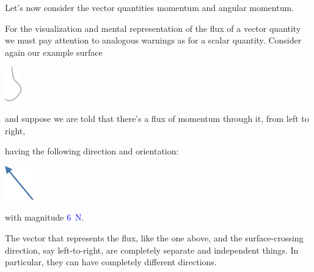 

\label{nsec:intuition_vector}

Let's now consider the vector quantities momentum and angular momentum.




\bigskip


For the visualization and mental representation of the flux of a vector quantity we must pay attention to analogous warnings as for a scalar quantity. Consider again our example surface
\begin{center}
  \includegraphics[height=4em]{images/fluxsurface.pdf}
\end{center}
and suppose we are told that there's a flux of momentum through it, from left to right, {having the following direction and orientation:\noprelistbreak%
\begin{center}
  \includegraphics[height=4em]{images/vec_NW.pdf}
\end{center}
}
\noindent with magnitude \textcolor{blue}{\qty{6}{N}}.

\begin{warning}
  The vector that represents the flux, like the one above, and the surface-crossing direction, say left-to-right, are completely separate and independent things. In particular, they can have completely different directions.
\end{warning}

\smallskip

